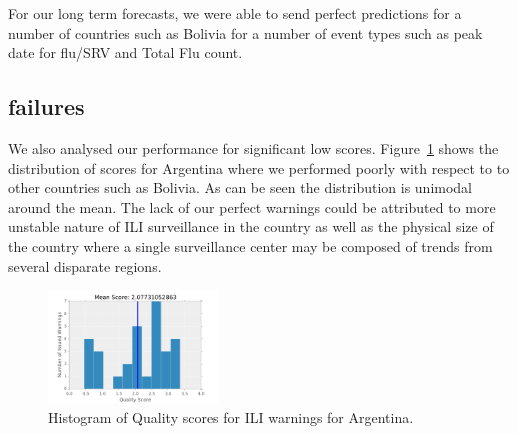 For our long term forecasts, we were able to send perfect predictions for a
number of countries such as Bolivia for a number of event types such as
peak date for flu/SRV and Total Flu count.

\subsection{failures}

We also analysed our performance for significant low scores.
Figure~\ref{fig:ili_hist:arg} shows the distribution of scores for Argentina where
we performed poorly with respect to to other countries such as Bolivia. As can be seen the
distribution is unimodal around the mean. The lack of our perfect warnings
could be attributed to more unstable nature of ILI surveillance in the country as
well as the physical size of the country where a single surveillance
center may be composed of trends from several disparate regions.

\begin{figure}
  \includegraphics[width=0.4\textwidth]{../figures/ili/Failure_Argentina.pdf}
  \caption{\label{fig:ili_hist:arg}Histogram of Quality scores for ILI warnings
  for Argentina.}
\end{figure}


